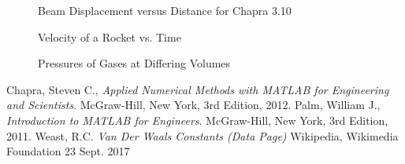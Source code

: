 \documentclass{article}
\begin{document}
\begin{figure}[ht!]
\begin{center}
\caption{Beam Displacement versus Distance for Chapra 3.10}
\end{center}
\end{figure}

\begin{figure}[ht!]
\begin{center}
\caption{Velocity of a Rocket vs. Time}
\end{center}
\end{figure}

\begin{figure}[ht!]
\begin{center}
\caption{Pressures of Gases at Differing Volumes}
\end{center}
\end{figure}



\clearpage %

\begin{thebibliography}{9}
  Chapra, Steven C.,
  {\it Applied Numerical Methods with MATLAB for Engineering and Scientists}.
  McGraw-Hill, New York,
  3rd Edition,
  2012.
  Palm, William J.,
  {\it Introduction to MATLAB for Engineers}.
  McGraw-Hill, New York,
  3rd Edition,
  2011.
  Weast, R.C. 
  {\it Van Der Waals Constants (Data Page)}
  Wikipedia, Wikimedia Foundation
  23 Sept. 2017

\end{thebibliography}
\end{document}
